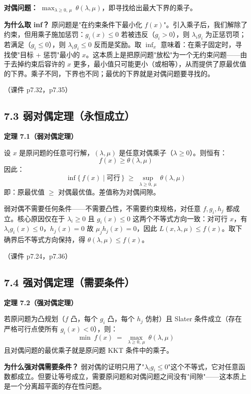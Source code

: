 \textbf{对偶问题：} $\displaystyle\max_{\lambda \ge 0,\,\mu}\ \theta(\lambda,\mu)$，即寻找给出最大下界的乘子。

\textbf{为什么取 inf？} 原问题是"在约束条件下最小化 $f(x)$"。引入乘子后，我们解除了约束，但用乘子施加惩罚：$g_i(x) \le 0$ 若被违反（$g_i > 0$），则 $\lambda_i g_i$ 为正惩罚项；若满足（$g_i \le 0$），则 $\lambda_i g_i \le 0$ 反而是奖励。取 $\inf_x$ 意味着：在乘子固定时，寻找使"目标 + 惩罚"最小的 $x$。这本质上是把原问题"放松"为一个无约束问题——由于去掉约束后容许的 $x$ 更多，最小值只可能更小（或相等），从而提供了原最优值的下界。乘子不同，下界也不同；最优的下界就是对偶问题要寻找的。

（课件 p7.32，p7.35）

\subsection{7.3 弱对偶定理（永恒成立）}

\textbf{定理 7.1（弱对偶定理）}

设 $x$ 是原问题的任意可行解，$(\lambda,\mu)$ 是任意对偶乘子（$\lambda \ge 0$）。则恒有：
\[
f(x) \ge \theta(\lambda,\mu)
\]
因此：
\[
\inf\{\,f(x) \mid \text{可行}\,\} \;\ge\; \sup_{\lambda \ge 0,\,\mu}\ \theta(\lambda,\mu)
\]
即：原最优值 $\ge$ 对偶最优值。差值称为对偶间隙。

弱对偶不需要任何条件——不需要凸性，不需要约束规格，对任意 $f,g_i,h_j$ 都成立。核心原因仅在于 $\lambda_i \ge 0$ 且 $g_i(x) \le 0$ 这两个不等式方向一致：对可行 $x$，有 $\lambda_i g_i(x) \le 0$，$h_j(x)=0$ 故 $\mu_j h_j(x)=0$，因此 $L(x,\lambda,\mu) \le f(x)$。取下确界后不等式方向保持，得 $\theta(\lambda,\mu) \le f(x)$。

（课件 p7.24，p7.36）

\subsection{7.4 强对偶定理（需要条件）}

\textbf{定理 7.2（强对偶定理）}

若原问题为凸规划（$f$ 凸，每个 $g_i$ 凸，每个 $h_j$ 仿射）且 Slater 条件成立（存在严格可行点使所有 $g_i(x)<0$），则：
\[
\min\ f(x) \;=\; \max_{\lambda \ge 0,\,\mu}\ \theta(\lambda,\mu)
\]
且对偶问题的最优乘子就是原问题 KKT 条件中的乘子。

\textbf{为什么强对偶需要条件？} 弱对偶的证明只用了"$\lambda_i g_i \le 0$"这个不等式，它对任意函数都成立。但要让等号成立，需要原问题和对偶问题之间没有"间隙"——这本质上是一个分离超平面的存在性问题。

